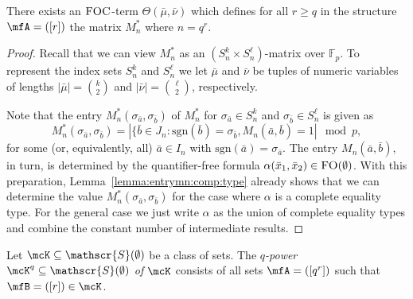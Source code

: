 \documentclass[a4paper,UKenglish]{lipics}
\newcommand{\inseg}[1]{\ensuremath{[#1]}}
\newcommand{\card}[1]{\ensuremath{|#1|}}
\newcommand{\sgn}{\ensuremath{\textrm{sgn}}}
\newcommand{\field}[1]{\mathbb{#1}}
\newcommand{\Str}{\ensuremath{\mathscr{S}}}
\newcommand{\logic}[1]{\ensuremath{\textsc{#1}}\xspace}
\newcommand{\FO}{\logic{FO}}
\newcommand{\FOC}{\logic{FOC}}
\newcommand{\ba}{{\bar a}}
\newcommand{\bb}{{\bar b}}
\newcommand{\bx}{{\bar x}}
\newcommand{\bmu}{{\bar \mu}}
\newcommand{\bnu}{{\bar \nu}}
\theoremstyle{plain}
\begin{document}
\begin{lemma}\label{lemma:mnstar:definable}
There exists an $\FOC$-term $\Theta(\bmu, \bnu)$ which defines for 
all $r \geq q $ in the structure $\mfA = (\inseg{r})$ the matrix $M_n^*$ 
where $n = q^r$.
\end{lemma}

\begin{proof}
 Recall that we can view $M_n^*$ as an $(S_n^k \times 
S_n^\ell)$-matrix over $\field F_p$. To represent the index sets $S_n^k$ 
and $S_n^\ell$ we let $\bmu$ and $\bnu$ be tuples of numeric variables of 
lengths $|\bmu| = {k \choose 2}$ and $|\bnu|  = {\ell \choose 2}$, 
respectively.

Note that the entry $M_n^*(\sigma_{\ba}, \sigma_{\bb})$ of $M_n^*$
for $\sigma_{\ba} \in S_n^k$ and $\sigma_{\bb} \in S_n^\ell$ is given as 
\[ M_n^*(\sigma_{\ba},\sigma_{\bb}) = \card { \{ \bb \in J_n : \sgn(\bb) 
= \sigma_{\bb}, M_n(\ba,\bb) = 1 } \mod p, \]
for some (or, equivalently, all) $\ba \in I_n$ with $\sgn(\ba) = 
\sigma_{\ba}$. The entry $M_n(\ba,\bb)$, in turn, is 
determined by the quantifier-free formula $\alpha(\bx_1, \bx_2) \in 
\FO(\emptyset)$. With this preparation, 
Lemma~\ref{lemma:entrymn:comp:type} already shows that we can determine 
the value $M_n^*(\sigma_{\ba},\sigma_{\bb})$ for the case where $\alpha$ is 
a complete equality type. For the general case we just write $\alpha$ as 
the union of complete equality types and combine the constant number of 
intermediate results.
\end{proof}


\begin{definition}
 Let $\mcK \subseteq \Str(\emptyset)$ be a class of sets. The 
\emph{$q$-power $\mcK^q \subseteq \Str(\emptyset)$ of $\mcK$} 
consists of all sets $\mfA = (\inseg {q^r})$ such that $\mfB = (\inseg r) 
\in \mcK$.
\end{definition}
\end{document}
